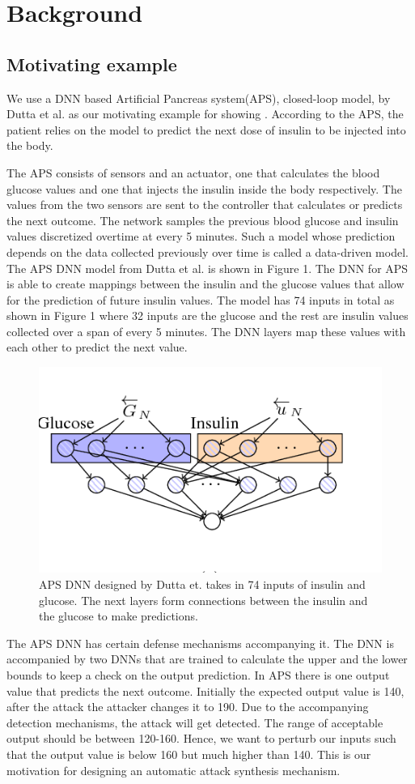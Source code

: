 \chapter{Background}
\label{ch:Chapter3}
\section{Motivating example}
We use a DNN based Artificial Pancreas system(APS), closed-loop model, by Dutta et al. \cite{10.1007/978-3-319-99429-1_11}  as our motivating example for showing \attack. According to the APS, the patient relies on the model to predict the next dose of insulin to be injected into the body. 

The APS consists of sensors and an actuator, one that calculates the blood glucose values and one that injects the insulin inside the body respectively. The values from the two sensors are sent to the controller that calculates or predicts the next outcome. The network samples the previous blood glucose and insulin values discretized overtime at every 5 minutes. Such a model whose prediction depends on the data collected previously over time is called a data-driven model. The APS DNN model from Dutta et al. is shown in Figure 1. The DNN for APS is able to create mappings between the insulin and the glucose values that allow for the prediction of future insulin values. The model has 74 inputs in total as shown in Figure 1 where 32 inputs are the glucose and the rest are insulin values collected over a span of every 5 minutes. The DNN layers map these values with each other to predict the next value. 
\begin{figure}
	\centering
	\includegraphics[width=0.7\linewidth, height=0.3\linewidth]{Images/APSDNN}
	\caption[APS DNN]{APS DNN designed by Dutta et. takes in 74 inputs of insulin and glucose. The next layers form connections between the insulin and the glucose to make predictions.}
	\label{fig:apsdnn}
\end{figure}

The APS DNN has certain defense mechanisms accompanying it. The DNN is accompanied by two DNNs that are trained to calculate the upper and the lower bounds to keep a check on the output prediction. In APS there is one output value that predicts the next outcome. Initially the expected output value is 140, after the attack the attacker changes it to 190. Due to the accompanying detection mechanisms, the attack will get detected. The range of acceptable output should be between 120-160. Hence, we want to perturb our inputs such that the output value is below 160 but much higher than 140. This is our motivation for designing an automatic attack synthesis mechanism. 

